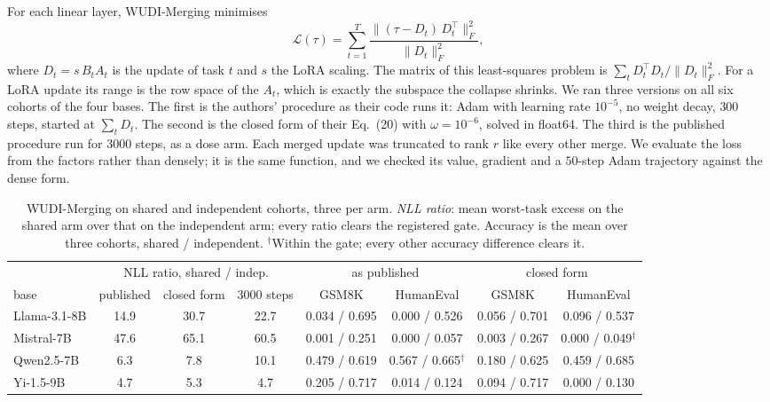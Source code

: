 For each linear layer, WUDI-Merging minimises
\begin{equation}\label{eq:wudi}
  \mathcal{L}(\tau) = \sum_{t=1}^{T}
  \frac{\|(\tau - D_t)\,D_t^\top\|_F^2}{\|D_t\|_F^2},
\end{equation}
where $D_t = s\,B_tA_t$ is the update of task $t$ and $s$ the LoRA scaling.
The matrix of this least-squares problem is
$\sum_t D_t^\top D_t / \|D_t\|_F^2$. For a LoRA update its range is the row
space of the $A_t$, which is exactly the subspace the collapse shrinks. We ran
three versions on all six cohorts of the four bases. The first is the authors'
procedure as their code runs it: Adam with learning rate $10^{-5}$, no weight
decay, $300$ steps, started at $\sum_t D_t$. The second is the closed form of
their Eq.~(20) with $\omega = 10^{-6}$, solved in float64. The third is the
published procedure run for $3000$ steps, as a dose arm. Each merged update was
truncated to rank $r$ like every other merge. We evaluate the loss from the
factors rather than densely; it is the same function, and we checked its value,
gradient and a $50$-step Adam trajectory against the dense form.

\begin{table}[pos=tbp]
\centering
\small
\caption{WUDI-Merging on shared and independent cohorts, three per arm.
\emph{NLL ratio}: mean worst-task excess on the shared arm over that on the
independent arm; every ratio clears the registered gate. Accuracy is the mean
over three cohorts, shared / independent. $^\dagger$Within the gate; every
other accuracy difference clears it.}
\label{tab:wudi}
\setlength{\tabcolsep}{4pt}
\begin{tabular}{lccccccc}
\toprule
 & \multicolumn{3}{c}{NLL ratio, shared / indep.}
 & \multicolumn{2}{c}{as published}
 & \multicolumn{2}{c}{closed form} \\
\cmidrule(lr){2-4}\cmidrule(lr){5-6}\cmidrule(lr){7-8}
base & published & closed form & 3000 steps & GSM8K & HumanEval & GSM8K & HumanEval \\
\midrule
Llama-3.1-8B & 14.9 & 30.7 & 22.7 & 0.034 / 0.695 & 0.000 / 0.526 & 0.056 / 0.701 & 0.096 / 0.537 \\
Mistral-7B   & 47.6 & 65.1 & 60.5 & 0.001 / 0.251 & 0.000 / 0.057 & 0.003 / 0.267 & 0.000 / 0.049$^\dagger$ \\
Qwen2.5-7B   &  6.3 &  7.8 & 10.1 & 0.479 / 0.619 & 0.567 / 0.665$^\dagger$ & 0.180 / 0.625 & 0.459 / 0.685 \\
Yi-1.5-9B    &  4.7 &  5.3 &  4.7 & 0.205 / 0.717 & 0.014 / 0.124 & 0.094 / 0.717 & 0.000 / 0.130 \\
\bottomrule
\end{tabular}
\end{table}

